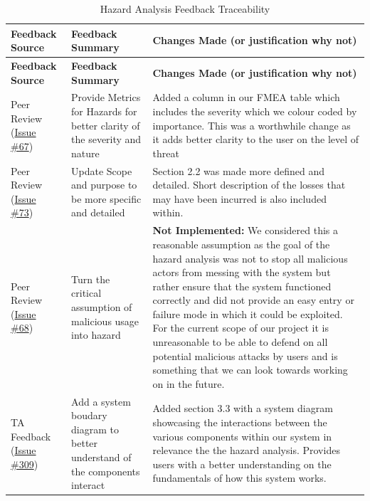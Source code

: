 \documentclass{article}
\begin{document}
\begin{longtable}{|>{\raggedright\arraybackslash}p{}|>{\raggedright\arraybackslash}p{}|>{\raggedright\arraybackslash}p{}|}
\caption{Hazard Analysis Feedback Traceability}
\label{tab:hazard-feedback-traceability}\\
\hline
\textbf{Feedback Source} & \textbf{Feedback Summary} & \textbf{Changes Made (or justification why not)} \\
\hline
\endfirsthead

\hline
\textbf{Feedback Source} & \textbf{Feedback Summary} & \textbf{Changes Made (or justification why not)} \\
\hline
\endhead

\hline
\endfoot

\hline
\endlastfoot

Peer Review (\href{https://github.com/VirochaanRG/MES-Event-Management-System/issues/67}{Issue \#67}) & Provide Metrics for Hazards for better clarity of the severity and nature & Added a column in our FMEA table which includes the severity which we colour coded by importance. This was a worthwhile change as it adds better clarity to the user on the level of threat\\
\hline
Peer Review (\href{https://github.com/VirochaanRG/MES-Event-Management-System/issues/73}{Issue \#73}) &  Update Scope and purpose to be more specific and detailed & Section 2.2 was made more defined and detailed. Short description of the losses that may have been incurred is also included within.\\
\hline
Peer Review (\href{https://github.com/VirochaanRG/MES-Event-Management-System/issues/68}{Issue \#68}) & Turn the critical assumption of malicious usage into hazard & \textbf{Not Implemented:} We considered this a reasonable assumption as the goal of the hazard analysis was not to stop all malicious actors from messing with the system but rather ensure that the system functioned correctly and did not provide an easy entry or failure mode in which it could be exploited. For the current scope of our project it is unreasonable to be able to defend on all potential malicious attacks by users and is something that we can look towards working on in the future.\\
\hline
TA Feedback (\href{https://github.com/VirochaanRG/MES-Event-Management-System/issues/309}{Issue \#309}) & Add a system boudary diagram to better understand of the components interact  & Added section 3.3 with a system diagram showcasing the interactions between the various components within our system in relevance the the hazard analysis. Provides users with a better understanding on the fundamentals of how this system works.\\
\hline
\end{longtable}
\end{document}
